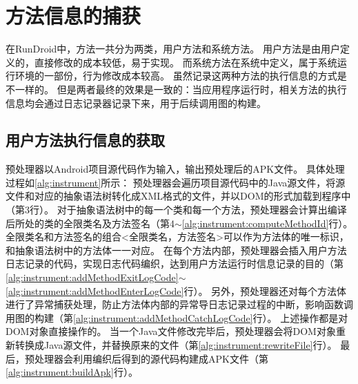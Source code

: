 



\section{方法信息的捕获}

在RunDroid中，方法一共分为两类，用户方法和系统方法。
用户方法是由用户定义的，直接修改的成本较低，易于实现。
而系统方法在系统中定义，属于系统运行环境的一部份，行为修改成本较高。
虽然记录这两种方法的执行信息的方式是不一样的。
但是两者最终的效果是一致的：当应用程序运行时，相关方法的执行信息均会通过日志记录器记录下来，用于后续调用图的构建。


\subsection{用户方法执行信息的获取}%


预处理器以Android项目源代码作为输入，输出预处理后的APK文件。
具体处理过程如\autoref{alg:instrument}所示：
预处理器会遍历项目源代码中的Java源文件，将源文件和对应的抽象语法树转化成XML格式的文件，并以DOM的形式加载到程序中（第3行）。
对于抽象语法树中的每一个类和每一个方法，预处理器会计算出编译后所处的类的全限类名及方法签名（第4$\sim$\ref{alg:instrument:computeMethodId}行）。
全限类名和方法签名的组合<全限类名，方法签名>可以作为方法体的唯一标识，和抽象语法树中的方法体一一对应。
在每个方法内部，预处理器会插入用户方法日志记录的代码，实现日志代码编织，达到用户方法运行时信息记录的目的（第\ref{alg:instrument:addMethodExitLogCode}$\sim$\ref{alg:instrument:addMethodEnterLogCode}行）。
另外，预处理器还对每个方法体进行了异常捕获处理，防止方法体内部的异常导日志记录过程的中断，影响函数调用图的构建（第\ref{alg:instrument:addMethodCatchLogCode}行）。
上述操作都是对DOM对象直接操作的。
当一个Java文件修改完毕后，预处理器会将DOM对象重新转换成Java源文件，并替换原来的文件（第\ref{alg:instrument:rewriteFile}行）。
最后，预处理器会利用编织后得到的源代码构建成APK文件（第\ref{alg:instrument:buildApk}行）。




